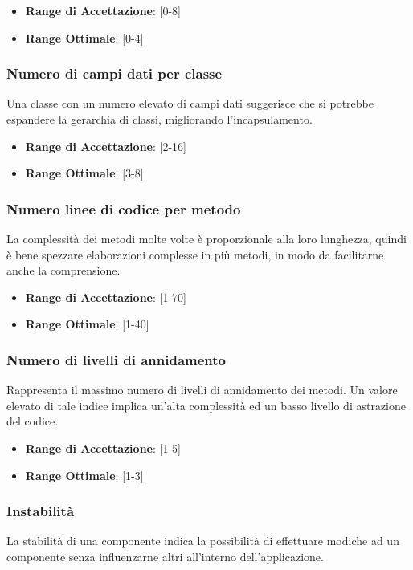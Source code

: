 \documentclass[12pt,a4paper]{article}
\begin{document}
\begin{itemize}
\item \textbf{Range di Accettazione}: [0-8]
\item \textbf{Range Ottimale}: [0-4]
\end{itemize}

\subsubsection{Numero di campi dati per classe}
Una classe con un numero elevato di campi dati suggerisce che si potrebbe espandere la gerarchia di classi, migliorando l'incapsulamento.

\begin{itemize}
\item \textbf{Range di Accettazione}: [2-16]
\item \textbf{Range Ottimale}: [3-8]
\end{itemize}

\subsubsection{Numero linee di codice per metodo}
La complessità dei metodi molte volte è proporzionale alla loro lunghezza, quindi è bene spezzare elaborazioni complesse in più metodi, in modo da facilitarne anche la comprensione.

\begin{itemize}
\item \textbf{Range di Accettazione}: [1-70]
\item \textbf{Range Ottimale}: [1-40]
\end{itemize}

\subsubsection{Numero di livelli di annidamento}
Rappresenta il massimo numero di livelli di annidamento dei metodi. Un valore elevato di tale indice implica un'alta complessità ed un basso livello di astrazione del codice.

\begin{itemize}
\item \textbf{Range di Accettazione}: [1-5]
\item \textbf{Range Ottimale}: [1-3]
\end{itemize}

\subsubsection{Instabilità}
La stabilità di una componente indica la possibilità di effettuare modiche ad un componente senza influenzarne altri all'interno dell'applicazione.
\end{document}
